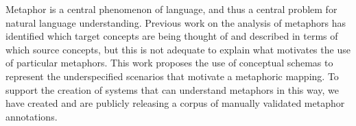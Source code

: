 Metaphor is a central phenomenon of language, and thus a central problem for natural language understanding. Previous work on the analysis of metaphors has identified which target concepts are being thought of and described in terms of which source concepts, but this is not adequate to explain what motivates the use of particular metaphors. This work proposes the use of conceptual schemas to represent the underspecified scenarios that motivate a metaphoric mapping. To support the creation of systems that can understand metaphors in this way, we have created and are publicly releasing a corpus of manually validated metaphor annotations.
